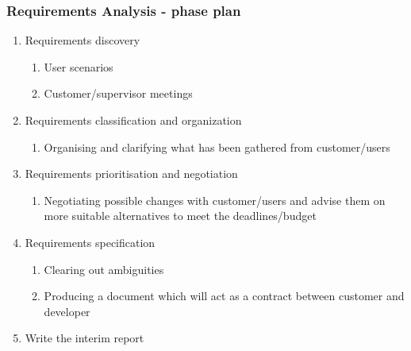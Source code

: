 \documentclass[12pt, a4paper]{report}   %
\begin{document}
\subsubsection{Requirements Analysis - phase plan}
\begin{enumerate}
	\item Requirements discovery
		\begin{enumerate}
			\item User scenarios
			\item Customer/supervisor meetings
		\end{enumerate}
	\item Requirements classification and organization
		\begin{enumerate}
			\item Organising and clarifying what has been gathered from customer/users
		\end{enumerate}
	\item Requirements prioritisation and negotiation
		\begin{enumerate}
			\item Negotiating possible changes with customer/users and advise them on more suitable alternatives to meet the deadlines/budget
		\end{enumerate}
	\item Requirements specification
		\begin{enumerate}
			\item Clearing out ambiguities
			\item Producing a document which will act as a contract between customer and developer
		\end{enumerate}
	\item Write the interim report
\end{enumerate}


\end{document}
